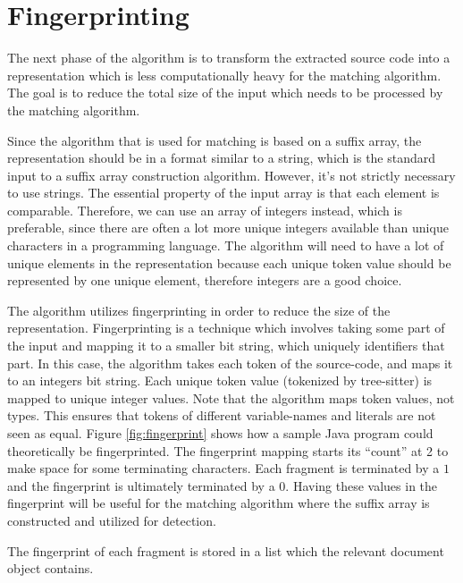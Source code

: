 \section{Fingerprinting}

The next phase of the algorithm is to transform the extracted source code into a
representation which is less computationally heavy for the matching algorithm. The goal is
to reduce the total size of the input which needs to be processed by the matching
algorithm.

Since the algorithm that is used for matching is based on a suffix array, the
representation should be in a format similar to a string, which is the standard input to a
suffix array construction algorithm. However, it's not strictly necessary to use strings.
The essential property of the input array is that each element is comparable. Therefore,
we can use an array of integers instead, which is preferable, since there are often a lot
more unique integers available than unique characters in a programming language. The
algorithm will need to have a lot of unique elements in the representation because each
unique token value should be represented by one unique element, therefore integers are a
good choice.

The algorithm utilizes fingerprinting in order to reduce the size of the representation.
Fingerprinting is a technique which involves taking some part of the input and mapping it
to a smaller bit string, which uniquely identifiers that part. In this case, the algorithm
takes each token of the source-code, and maps it to an integers bit string. Each unique
token value (tokenized by tree-sitter) is mapped to unique integer values. Note that the
algorithm maps token values, not types. This ensures that tokens of different
variable-names and literals are not seen as equal. Figure \ref{fig:fingerprint} shows how
a sample Java program could theoretically be fingerprinted. The fingerprint mapping starts
its ``count'' at 2 to make space for some terminating characters. Each fragment is
terminated by a $1$ and the fingerprint is ultimately terminated by a $0$. Having these
values in the fingerprint will be useful for the matching algorithm where the suffix array
is constructed and utilized for detection.

The fingerprint of each fragment is stored in a list which the relevant document object
contains.

